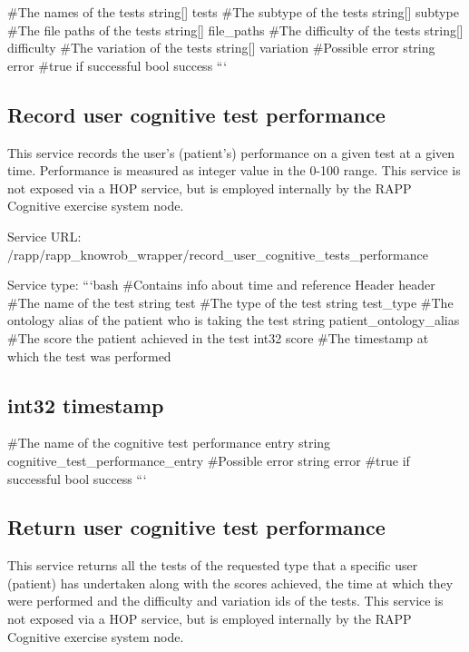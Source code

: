 \#\-The names of the tests string\mbox{[}\mbox{]} tests \#\-The subtype of the tests string\mbox{[}\mbox{]} subtype \#\-The file paths of the tests string\mbox{[}\mbox{]} file\-\_\-paths \#\-The difficulty of the tests string\mbox{[}\mbox{]} difficulty \#\-The variation of the tests string\mbox{[}\mbox{]} variation \#\-Possible error string error \#true if successful bool success ```

\subsection*{Record user cognitive test performance}

This service records the user’s (patient’s) performance on a given test at a given time. Performance is measured as integer value in the 0-\/100 range. This service is not exposed via a H\-O\-P service, but is employed internally by the R\-A\-P\-P Cognitive exercise system node.

Service U\-R\-L\-: {\ttfamily /rapp/rapp\-\_\-knowrob\-\_\-wrapper/record\-\_\-user\-\_\-cognitive\-\_\-tests\-\_\-performance}

Service type\-: ```bash \#\-Contains info about time and reference Header header \#\-The name of the test string test \#\-The type of the test string test\-\_\-type \#\-The ontology alias of the patient who is taking the test string patient\-\_\-ontology\-\_\-alias \#\-The score the patient achieved in the test int32 score \#\-The timestamp at which the test was performed \subsection*{int32 timestamp }

\#\-The name of the cognitive test performance entry string cognitive\-\_\-test\-\_\-performance\-\_\-entry \#\-Possible error string error \#true if successful bool success ```

\subsection*{Return user cognitive test performance}

This service returns all the tests of the requested type that a specific user (patient) has undertaken along with the scores achieved, the time at which they were performed and the difficulty and variation ids of the tests. This service is not exposed via a H\-O\-P service, but is employed internally by the R\-A\-P\-P Cognitive exercise system node.

